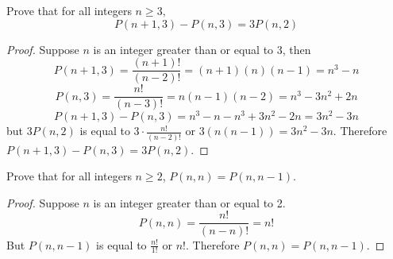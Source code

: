 \documentclass[12pt,letterpaper, onecolumn]{exam}
\begin{document}
	\begin{questions}
	\setcounter{question}{16}\question {}
	\begin{solution}
	\end{solution}
	\setcounter{question}{35}\question Prove that for all integers $n\geq3,$
	$$P(n+1,3)-P(n,3)=3P(n,2)$$
	\begin{solution}
		\begin{proof}
			Suppose $n$ is an integer greater than or equal to 3, then 
			$$P(n+1,3)=\frac{(n+1)!}{(n-2)!}=(n+1)(n)(n-1)=n^3-n$$
			$$P(n,3)=\frac{n!}{(n-3)!}=n(n-1)(n-2)=n^3-3n^2+2n$$
			$$P(n+1,3)-P(n,3)=n^3-n-n^3+3n^2-2n=3n^2-3n$$
			but $3P(n,2)$ is equal to $3\cdot\frac{n!}{(n-2)!}$ or $3(n(n-1))=3n^2-3n$. Therefore $P(n+1,3)-P(n,3)=3P(n,2)$.
		\end{proof}
	\end{solution}
	\question Prove that for all integers $n\geq2$, $P(n,n)=P(n,n-1).$
	\begin{solution}
		\begin{proof}
		Suppose $n$ is an integer greater than or equal to 2. 
		$$P(n,n)=\frac{n!}{(n-n)!}=n!$$
		But $P(n,n-1)$ is equal to $\frac{n!}{1!}$ or $n!$. Therefore $P(n,n)=P(n,n-1).$
		\end{proof}
	\end{solution}
	\end{questions}
	
\end{document}
